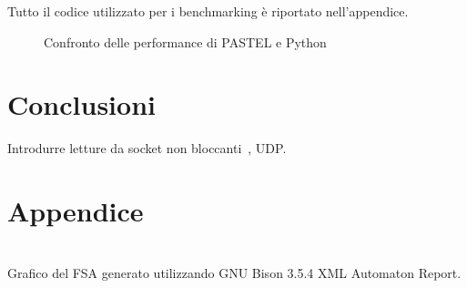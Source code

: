 \documentclass[10pt]{article}
\begin{document}
Tutto il codice utilizzato per i benchmarking è riportato nell'appendice.



\begin{figure}
	\centering
	\caption{Confronto delle performance di PASTEL e Python}
	\label{fig:performance-comparison}
\end{figure}



\section{Conclusioni}\label{section:conclusioni}

Introdurre letture da socket non bloccanti~\cite{hall2001beej}, UDP.


\clearpage



\clearpage



\section*{Appendice}\label{section:appendix}

\begin{center}
	\centering
	\\
	Grafico del FSA generato utilizzando GNU Bison 3.5.4 XML Automaton Report.
\end{center}







\end{document}
